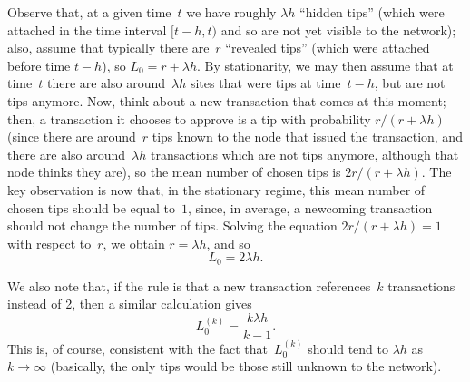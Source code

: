 \documentclass[12pt]{article}
\begin{document}
\begin{CJK}{UTF8}{bkai}
Observe that,
at a given time~$t$ we have roughly $\lambda h$ ``hidden tips'' 
(which were attached in the time interval $[t-h,t)$ 
 and so are not yet visible to the network);
also, assume that typically there are~$r$ ``revealed tips'' 
 (which were attached before time $t-h$), 
so $L_0 = r+ \lambda h$. 
By stationarity, we may then assume that at time~$t$ there 
are also around~$\lambda h$ sites that were tips at time~$t-h$, 
 but are not tips anymore. 
Now, think about a new transaction that comes at this moment;
then, a transaction it chooses to approve is a tip 
with probability $r/(r+\lambda h)$ (since there are around~$r$
tips known to the node that issued the transaction,
and there are also around~$\lambda h$ transactions which are not 
tips anymore, although that node thinks they are), 
so the mean number of chosen tips is $2r/(r+\lambda h)$. 
The key observation is now that, in the stationary regime,
this mean number of chosen tips should be equal to~$1$,
since, in average, a newcoming transaction should not change
the number of tips.
Solving the equation $2r/(r+\lambda h)=1$ with respect to~$r$, 
we obtain $r=\lambda h$, and so 
\begin{equation}
\label{L0_def} 
L_0 = 2\lambda h.
\end{equation}

We also note that,
if the rule is that a new transaction references~$k$ 
transactions instead of 2, then a similar calculation gives
\begin{equation}
\label{L0k_def} 
 L_0^{(k)} = \frac{k\lambda h}{k-1}.
\end{equation}
This is, of course, consistent with the fact that~$L_0^{(k)}$ 
should tend to $\lambda h$ as $k\to\infty$ (basically, the 
only tips would be those still unknown to the network).




\end{CJK}
\end{document}
